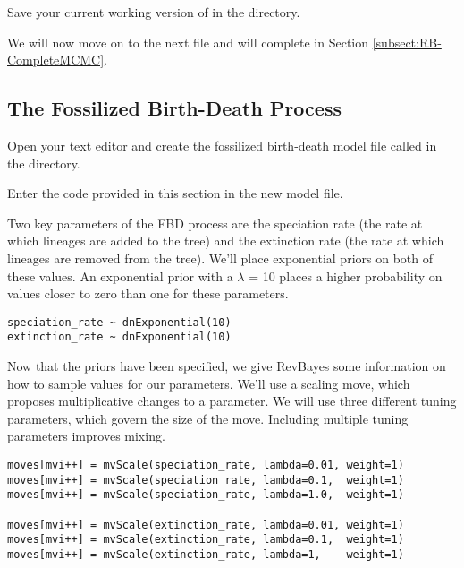 {\begin{framed}
Save your current working version of  in the  directory.

We will now move on to the next \Rev file and will complete  in Section \ref{subsect:RB-CompleteMCMC}.
\end{framed}}


\bigskip
\subsection{The Fossilized Birth-Death Process}\label{subsect:RB-ModelFBD}

{\begin{framed}
Open your text editor and create the fossilized birth-death model file called {\textcolor{red}{}} in the  directory.

Enter the \Rev code provided in this section in the new model file.
\end{framed}}

Two key parameters of the FBD process are the speciation rate (the rate at which lineages are added to the tree) and the extinction rate (the rate at which lineages are removed from the tree). 
We'll place exponential priors on both of these values. 
An exponential prior with a $\lambda$ =  10 places a higher probability on values closer to zero than one for these parameters. 

{\tt \begin{snugshade*}
\begin{lstlisting}
speciation_rate ~ dnExponential(10)
extinction_rate ~ dnExponential(10)
\end{lstlisting}
\end{snugshade*}}

Now that the priors have been specified, we give RevBayes some information on how to sample values for our parameters. 
We'll use a scaling move, which proposes multiplicative changes to a parameter. 
We will use three different tuning parameters, which govern the size of the move. 
Including multiple tuning parameters improves mixing. 

{\tt \begin{snugshade*}
\begin{lstlisting}
moves[mvi++] = mvScale(speciation_rate, lambda=0.01, weight=1)
moves[mvi++] = mvScale(speciation_rate, lambda=0.1,  weight=1)
moves[mvi++] = mvScale(speciation_rate, lambda=1.0,  weight=1)

moves[mvi++] = mvScale(extinction_rate, lambda=0.01, weight=1)
moves[mvi++] = mvScale(extinction_rate, lambda=0.1,  weight=1)
moves[mvi++] = mvScale(extinction_rate, lambda=1,    weight=1)
\end{lstlisting}
\end{snugshade*}}

